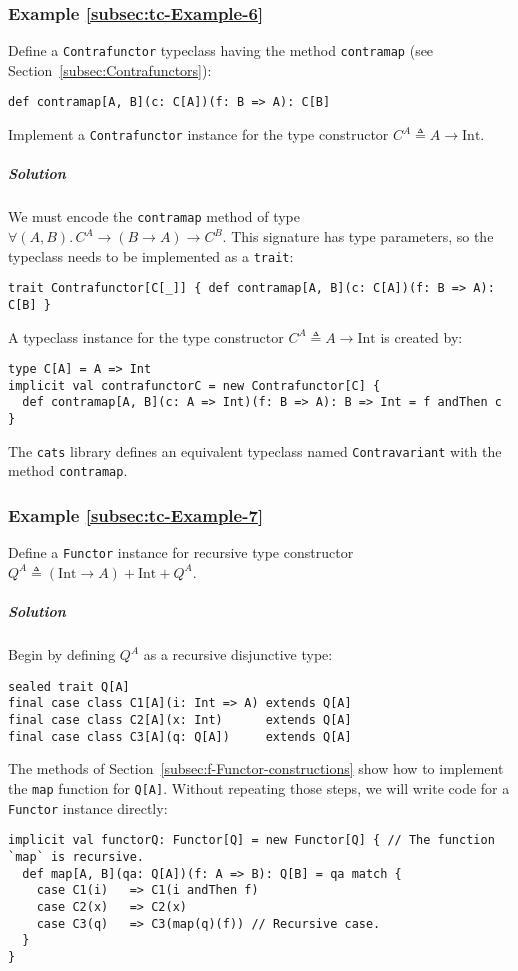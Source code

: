 \subsubsection{Example \label{subsec:tc-Example-6}\ref{subsec:tc-Example-6}}

Define a \lstinline!Contrafunctor! typeclass having the method \lstinline!contramap!
(see Section~\ref{subsec:Contrafunctors}):
\begin{lstlisting}
def contramap[A, B](c: C[A])(f: B => A): C[B]
\end{lstlisting}
Implement a \lstinline!Contrafunctor! instance for the type constructor
$C^{A}\triangleq A\rightarrow\text{Int}$.

\subparagraph{Solution}

We must encode the \lstinline!contramap! method of type $\forall(A,B).\,C^{A}\rightarrow(B\rightarrow A)\rightarrow C^{B}$.
This signature has type parameters, so the typeclass needs to be implemented
as a \lstinline!trait!:
\begin{lstlisting}
trait Contrafunctor[C[_]] { def contramap[A, B](c: C[A])(f: B => A): C[B] }
\end{lstlisting}
A typeclass instance for the type constructor $C^{A}\triangleq A\rightarrow\text{Int}$
is created by:
\begin{lstlisting}
type C[A] = A => Int
implicit val contrafunctorC = new Contrafunctor[C] {
  def contramap[A, B](c: A => Int)(f: B => A): B => Int = f andThen c
}
\end{lstlisting}

The \texttt{cats} library defines an equivalent typeclass named \lstinline!Contravariant!
with the method \lstinline!contramap!.

\subsubsection{Example \label{subsec:tc-Example-7}\ref{subsec:tc-Example-7}}

Define a \lstinline!Functor! instance for recursive type constructor
$Q^{A}\triangleq\left(\text{Int}\rightarrow A\right)+\text{Int}+Q^{A}$.

\subparagraph{Solution}

Begin by defining $Q^{A}$ as a recursive disjunctive type:
\begin{lstlisting}
sealed trait Q[A]
final case class C1[A](i: Int => A) extends Q[A]
final case class C2[A](x: Int)      extends Q[A]
final case class C3[A](q: Q[A])     extends Q[A]
\end{lstlisting}
The methods of Section~\ref{subsec:f-Functor-constructions} show
how to implement the \lstinline!map! function for \lstinline!Q[A]!.
Without repeating those steps, we will write code for a \lstinline!Functor!
instance directly:
\begin{lstlisting}
implicit val functorQ: Functor[Q] = new Functor[Q] { // The function `map` is recursive.
  def map[A, B](qa: Q[A])(f: A => B): Q[B] = qa match {
    case C1(i)   => C1(i andThen f)
    case C2(x)   => C2(x)
    case C3(q)   => C3(map(q)(f)) // Recursive case.
  }
}
\end{lstlisting}


